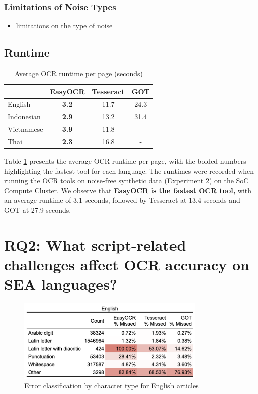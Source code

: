 \documentclass[12pt,oneside]{memoir}
\begin{document}
\subsubsection{Limitations of Noise Types}

\begin{itemize}
    \item limitations on the type of noise
\end{itemize}

\subsection{Runtime}

\begin{table}[ht]
    \caption{Average OCR runtime per page (seconds)}
    \label{table:runtime}
    \centering
    \begin{tabular}{lccc}
        \toprule
        & EasyOCR & Tesseract & GOT\\ 
        \midrule
        English & \textbf{3.2} & 11.7 & 24.3\\
        Indonesian & \textbf{2.9} & 13.2 & 31.4\\
        Vietnamese & \textbf{3.9} & 11.8 & -\\
        Thai & \textbf{2.3} & 16.8 & -\\
        \bottomrule
    \end{tabular}
\end{table}

Table \ref{table:runtime} presents the average OCR runtime per page, with the bolded numbers highlighting the fastest tool for each language. 
The runtimes were recorded when running the OCR tools on noise-free synthetic data (Experiment 2) on the SoC Compute Cluster. 
We observe that \textbf{EasyOCR is the fastest OCR tool,} with an average runtime of 3.1 seconds, followed by Tesseract at 13.4 seconds and GOT at 27.9 seconds.

\section{RQ2: What script-related challenges affect OCR accuracy on SEA languages?}

\begin{figure}[ht]
    \centering
    \includegraphics[width=0.8\textwidth]{images/error-classification-english.png}
    \caption{Error classification by character type for English articles}
    \label{figure:error-classification-english}
\end{figure}
\end{document}
